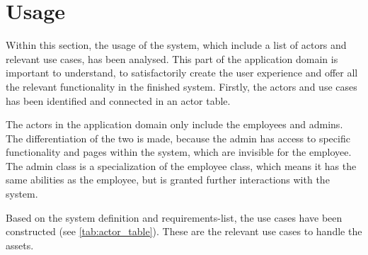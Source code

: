 \section{Usage}\label{sc:usage}
Within this section, the usage of the system, which include a list of actors and relevant use cases, has been analysed. This part of the application domain is important to understand, to satisfactorily create the user experience and offer all the relevant functionality in the finished system. Firstly, the actors and use cases has been identified and connected in an actor table.
\par
The actors in the application domain only include the employees and admins. The differentiation of the two is made, because the admin has access to specific functionality and pages within the system, which are invisible for the employee. The admin class is a specialization of the employee class, which means it has the same abilities as the employee, but is granted further interactions with the system.
\par
Based on the system definition and requirements-list, the use cases have been constructed (see \autoref{tab:actor_table}). These are the relevant use cases to handle the assets.

